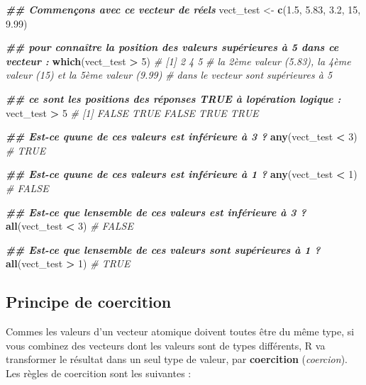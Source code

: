 \documentclass[
]{book}
\newenvironment{Shaded}{\begin{snugshade}}{\end{snugshade}}
\newcommand{\CommentTok}[1]{\textcolor[rgb]{0.56,0.35,0.01}{\textit{#1}}}
\newcommand{\DecValTok}[1]{\textcolor[rgb]{0.00,0.00,0.81}{#1}}
\newcommand{\DocumentationTok}[1]{\textcolor[rgb]{0.56,0.35,0.01}{\textbf{\textit{#1}}}}
\newcommand{\FloatTok}[1]{\textcolor[rgb]{0.00,0.00,0.81}{#1}}
\newcommand{\FunctionTok}[1]{\textcolor[rgb]{0.13,0.29,0.53}{\textbf{#1}}}
\newcommand{\NormalTok}[1]{#1}
\newcommand{\OtherTok}[1]{\textcolor[rgb]{0.56,0.35,0.01}{#1}}
\newcommand{\SpecialCharTok}[1]{\textcolor[rgb]{0.81,0.36,0.00}{\textbf{#1}}}
\begin{document}
\begin{Shaded}
\begin{Highlighting}[]
\DocumentationTok{\#\# Commençons avec ce vecteur de réels}
\NormalTok{vect\_test }\OtherTok{\textless{}{-}} \FunctionTok{c}\NormalTok{(}\FloatTok{1.5}\NormalTok{, }\FloatTok{5.83}\NormalTok{, }\FloatTok{3.2}\NormalTok{, }\DecValTok{15}\NormalTok{, }\FloatTok{9.99}\NormalTok{)}

\DocumentationTok{\#\# pour connaître la position des valeurs supérieures à 5 dans ce vecteur :}
\FunctionTok{which}\NormalTok{(vect\_test }\SpecialCharTok{\textgreater{}} \DecValTok{5}\NormalTok{)}
\CommentTok{\# [1] 2 4 5}
\CommentTok{\# la 2ème valeur (5.83), la 4ème valeur (15) et la 5ème valeur (9.99)}
\CommentTok{\# dans le vecteur sont supérieures à 5}

\DocumentationTok{\#\# ce sont les positions des réponses \textquotesingle{}TRUE\textquotesingle{} à l\textquotesingle{}opération logique :}
\NormalTok{vect\_test }\SpecialCharTok{\textgreater{}} \DecValTok{5}
\CommentTok{\# [1] FALSE  TRUE FALSE  TRUE  TRUE}

\DocumentationTok{\#\# Est{-}ce qu\textquotesingle{}une de ces valeurs est inférieure à 3 ?}
\FunctionTok{any}\NormalTok{(vect\_test }\SpecialCharTok{\textless{}} \DecValTok{3}\NormalTok{) }\CommentTok{\# TRUE}

\DocumentationTok{\#\# Est{-}ce qu\textquotesingle{}une de ces valeurs est inférieure à 1 ?}
\FunctionTok{any}\NormalTok{(vect\_test }\SpecialCharTok{\textless{}} \DecValTok{1}\NormalTok{) }\CommentTok{\# FALSE}

\DocumentationTok{\#\# Est{-}ce que l\textquotesingle{}ensemble de ces valeurs est inférieure à 3 ?}
\FunctionTok{all}\NormalTok{(vect\_test }\SpecialCharTok{\textless{}} \DecValTok{3}\NormalTok{) }\CommentTok{\#  FALSE}

\DocumentationTok{\#\# Est{-}ce que l\textquotesingle{}ensemble de ces valeurs sont supérieures à 1 ?}
\FunctionTok{all}\NormalTok{(vect\_test }\SpecialCharTok{\textgreater{}} \DecValTok{1}\NormalTok{) }\CommentTok{\# TRUE}
\end{Highlighting}
\end{Shaded}

\subsection{Principe de coercition}\label{principe-de-coercition}

Commes les valeurs d'un vecteur atomique doivent toutes être du même type, si vous combinez des vecteurs dont les valeurs sont de types différents, R va transformer le résultat dans un seul type de valeur, par \textbf{coercition} (\emph{coercion}). Les règles de coercition sont les suivantes :
\end{document}
